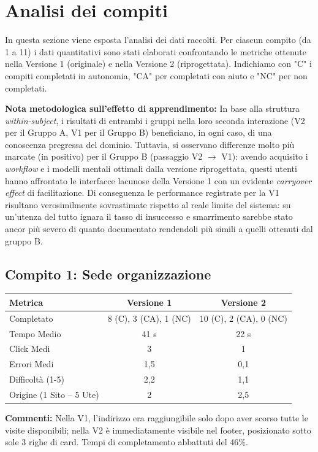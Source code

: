 \section{Analisi dei compiti}

In questa sezione viene esposta l'analisi dei dati raccolti. Per ciascun compito (da 1 a 11) i dati quantitativi sono stati elaborati confrontando le metriche ottenute nella Versione 1 (originale) e nella Versione 2 (riprogettata). Indichiamo con "C" i compiti completati in autonomia, "CA" per completati con aiuto e "NC" per non completati.


\textbf{Nota metodologica sull'effetto di apprendimento:} In base alla struttura \textit{within-subject}, i risultati di entrambi i gruppi nella loro seconda interazione (V2 per il Gruppo A, V1 per il Gruppo B) beneficiano, in ogni caso, di una conoscenza pregressa del dominio. Tuttavia, si osservano differenze molto più marcate (in positivo) per il Gruppo B (passaggio V2 $\to$ V1): avendo acquisito i \textit{workflow} e i modelli mentali ottimali dalla versione riprogettata, questi utenti hanno affrontato le interfacce lacunose della Versione 1 con un evidente \textit{carryover effect} di facilitazione. Di conseguenza le performance registrate per la V1 risultano verosimilmente sovrastimate rispetto al reale limite del sistema: su un'utenza del tutto ignara il tasso di insuccesso e smarrimento sarebbe stato ancor più severo di quanto documentato rendendoli più simili a quelli ottenuti dal gruppo B.


\subsection{Compito 1: Sede organizzazione}
\begin{table}[H]
\centering
\renewcommand{\arraystretch}{1.2}
\small
\begin{tabular}{|l|c|c|}
\hline
\textbf{Metrica} & \textbf{Versione 1} & \textbf{Versione 2} \\
\hline
Completato & 8 (C), 3 (CA), 1 (NC) & 10 (C), 2 (CA), 0 (NC) \\ \hline
Tempo Medio & 41 s & 22 s \\ \hline
Click Medi & 3 & 1 \\ \hline
Errori Medi & 1,5 & 0,1 \\ \hline
Difficoltà (1-5) & 2,2 & 1,1 \\ \hline
Origine (1 Sito -- 5 Ute) & 2 & 2,5 \\ \hline
\end{tabular}
\end{table}
\textbf{Commenti:} Nella V1, l'indirizzo era raggiungibile solo dopo aver scorso tutte le visite disponibili; nella V2 è immediatamente visibile nel footer, posizionato sotto sole 3 righe di card. Tempi di completamento abbattuti del 46\%.

